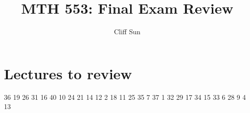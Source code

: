 \documentclass{article}
\title{MTH 553: Final Exam Review}
\author{Cliff Sun}
\newtheorem{one minute paper}[theorem]{One Minute Paper}
\begin{document}
\maketitle

\section*{Lectures to review}

36 19 26 31 16 40 10 24 21 14 12  2 18 11 25 35  7 37  1 32 29 17 34 15
 33  6 28  9  4 13
\end{document}
